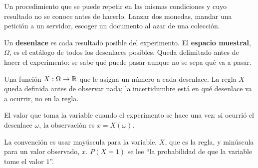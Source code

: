 \documentclass[11pt,letterpaper]{article}
\begin{document}
\begin{definicion}
    Un procedimiento que se puede repetir en las mismas condiciones y
    cuyo resultado no se conoce antes de hacerlo. Lanzar dos monedas,
    mandar una petición a un servidor, escoger un documento al azar de
    una colección.
\end{definicion}

\begin{definicion}
    Un \textbf{desenlace} es cada resultado posible del experimento. El
    \textbf{espacio muestral}, $\Omega$, es el catálogo de todos los
    desenlaces posibles. Queda delimitado antes de hacer el
    experimento: se sabe qué puede pasar aunque no se sepa qué va a
    pasar.
\end{definicion}

\begin{definicion}
    Una función $X : \Omega \to \mathbb{R}$ que le asigna un número a cada
    desenlace. La regla $X$ queda definida antes de observar nada; la
    incertidumbre está en qué desenlace va a ocurrir, no en la regla.
\end{definicion}

\begin{definicion}[Observación]
    El valor que toma la variable cuando el experimento se hace una
    vez: si ocurrió el desenlace $\omega$, la observación es
    $x = X(\omega)$.
\end{definicion}

La convención es usar mayúscula para la variable, $X$, que es la
regla, y minúscula para un valor observado, $x$. $P(X = 1)$ se lee
``la probabilidad de que la variable tome el valor $1$''.
\end{document}
